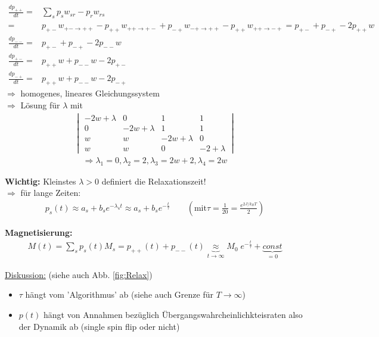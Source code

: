 \documentclass[12pt]{article}
\begin{document}
  \begin{align*}
 \frac{dp_{++}}{dt} =& \sum_s p_s w_{s r} - p_{r} w_{r s} \\
 =& p_{+-} w_{+- \rightarrow ++} - p_{++} w_{++ \rightarrow +-} +
 p_{-+} w_{-+ \rightarrow ++} - p_{++} w_{++ \rightarrow -+} =
 p_{+-} + p_{-+} - 2 p_{++} w \\
 \frac{dp_{--}}{dt}= & p_{+-} + p_{-+} - 2p_{--}w \\
  \frac{dp_{+-}}{dt}= & p_{++}w + p_{--} w- 2p_{+-} \\
   \frac{dp_{-+}}{dt}= & p_{++}w + p_{--}w -2p_{-+}
 \end{align*}
$\Rightarrow$ homogenes, lineares Gleichungssystem \\
$\Rightarrow$ Lösung für $\lambda$ mit 
\begin{align*}
\begin{vmatrix}
-2w+\lambda & 0 & 1 & 1 \\
0 & -2w +\lambda & 1 & 1 \\
w & w & -2w + \lambda & 0 \\
w & w & 0 & -2+\lambda 
\end{vmatrix} 
\end{align*}
\begin{align*}
\Rightarrow \lambda_1=0, \lambda_2=2, \lambda_3=2w+2, \lambda_4=2w \end{align*}

\textbf{Wichtig:} Kleinstes $\lambda >0$ definiert die Relaxationszeit! \\
$\Rightarrow$ für lange Zeiten: 
\begin{align*} p_s(t) \approx a_s + b_s e^{-\lambda_4 t} \approx a_s + b_s e^{-\frac{t}{\tau}} \quad \quad \left(\text{mit} \tau= \frac{1}{20}= \frac{e^{2J/k_BT}}{2} \right)
\end{align*}

\textbf{Magnetisierung:} 
\begin{align}
M(t)= \sum_s p_s(t) M_s = p_{++}(t) + p_{--}(t) \underbrace{\approx}_{t \to \infty} M_0 \; e^{-\frac{t}{\tau}} + \underbrace{const}_{=0}
\end{align}


\underline{Diskussion:}  (siehe auch Abb. \ref{fig:Relax})
\begin{itemize}
\item $\tau$ hängt vom 'Algorithmus' ab (siehe auch Grenze für $T\to \infty $)
\item $p(t)$ hängt von Annahmen bezüglich Übergangswahrcheinlichkteisraten  also der Dynamik ab (single spin flip oder nicht)
\end{itemize}
\end{document}
